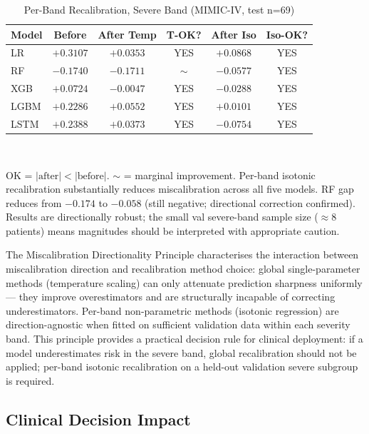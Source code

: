\documentclass{ieeeaccess}
\begin{document}
\begin{table}[t!]
\caption{Per-Band Recalibration, Severe Band (MIMIC-IV, test n=69)}
\label{tab:perband_recal}
\centering
\footnotesize
\setlength{\tabcolsep}{2.5pt}
\begin{tabularx}{\columnwidth}{@{}lccccc@{}}
\toprule
\textbf{Model} & \textbf{Before} & \textbf{After Temp} & \textbf{T-OK?} & \textbf{After Iso} & \textbf{Iso-OK?} \\
\midrule
LR   & $+0.3107$ & $+0.0353$ & YES & $+0.0868$ & YES \\
RF   & $-0.1740$ & $-0.1711$ & $\sim$ & $-0.0577$ & YES \\
XGB  & $+0.0724$ & $-0.0047$ & YES & $-0.0288$ & YES \\
LGBM & $+0.2286$ & $+0.0552$ & YES & $+0.0101$ & YES \\
LSTM & $+0.2388$ & $+0.0373$ & YES & $-0.0754$ & YES \\
\bottomrule
\end{tabularx}
\\[4pt]
\parbox{\columnwidth}{\footnotesize OK = $|\text{after}| < |\text{before}|$. $\sim$ = marginal improvement. Per-band isotonic recalibration substantially reduces miscalibration across all five models. RF gap reduces from $-0.174$ to $-0.058$ (still negative; directional correction confirmed). Results are directionally robust; the small val severe-band sample size ($\approx$8 patients) means magnitudes should be interpreted with appropriate caution.}
\end{table}

The Miscalibration Directionality Principle characterises the interaction between miscalibration direction and recalibration method choice: global single-parameter methods (temperature scaling) can only attenuate prediction sharpness uniformly — they improve overestimators and are structurally incapable of correcting underestimators. Per-band non-parametric methods (isotonic regression) are direction-agnostic when fitted on sufficient validation data within each severity band. This principle provides a practical decision rule for clinical deployment: if a model underestimates risk in the severe band, global recalibration should not be applied; per-band isotonic recalibration on a held-out validation severe subgroup is required.

\subsection{Clinical Decision Impact}
\end{document}
